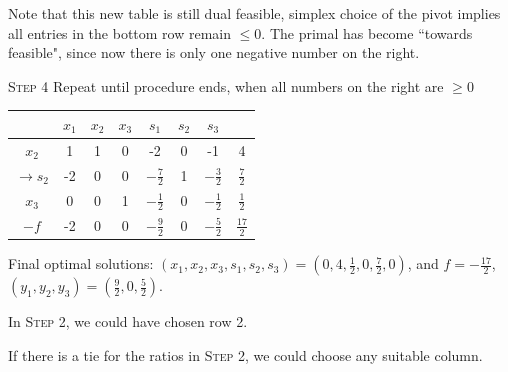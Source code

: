 \begin{procedure}
    Note that this new table is still dual feasible, simplex choice of the pivot implies all entries in the bottom row remain $\le 0$. The primal has become ``towards feasible", since now there is only one negative number on the right.

    \noindent\textcolor{MarkerColour}{\textsc{Step 4}} Repeat until procedure ends, when all numbers on the right are $\ge 0$
    \begin{table}[H]
        \centering
        \begin{tabular}{|c|cccccc|c|}
        \hline
        & $x_1$ & $x_2$ & $x_3$ & $s_1$ & $s_2$ & $s_3$ &  \\ \hline
        $ x_2$ &1 & 1 & 0 & -2 & 0 & -1 & 4 \\
        $\to s_2$ &-2 & 0 & 0 & $-\frac{7}{2}$ & 1 & $-\frac{3}{2}$ & $\frac{7}{2}$\\
        $x_3$ &0 & 0& 1 & $-\frac{1}{2}$ & 0 & $-\frac{1}{2}$ & $\frac{1}{2}$\\ \hline
        $-f$ & -2 & 0 & 0 & $-\frac{9}{2}$ & 0 & $-\frac{5}{2}$ & $\frac{17}{2}$ \\ \hline
        \end{tabular}
        \label{tab-4}
    \end{table}
    Final optimal solutions: $(x_1, x_2, x_3, s_1, s_2, s_3) = (0, 4, \frac{1}{2}, 0, \frac{7}{2}, 0)$, and $f=-\frac{17}{2}$, $(y_1, y_2, y_3) = (\frac{9}{2}, 0, \frac{5}{2})$.
\end{procedure}
\begin{remark}
    \par\noindent In \textcolor{MarkerColour}{\textsc{Step 2}}, we could have chosen row 2.
    
    \noindent If there is a tie for the ratios in \textcolor{MarkerColour}{\textsc{Step 2}}, we could choose any suitable column.
\end{remark}

